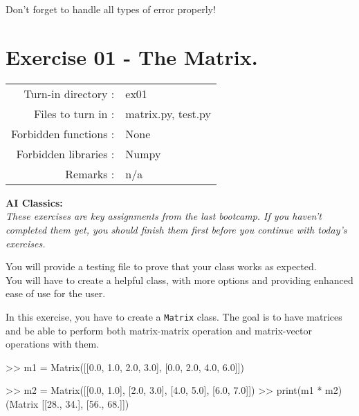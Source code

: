 \documentclass[]{article}
\newenvironment{Shaded}{\begin{snugshade}}{\end{snugshade}}
\newcommand{\BuiltInTok}[1]{\textcolor[rgb]{0.50,0.55,0.55}{#1}}
\newcommand{\FloatTok}[1]{\textcolor[rgb]{0.96,0.45,0.00}{#1}}
\newcommand{\NormalTok}[1]{\textcolor[rgb]{0.81,0.81,0.76}{#1}}
\newcommand{\OperatorTok}[1]{\textcolor[rgb]{0.81,0.81,0.76}{#1}}
\begin{document}
Don't forget to handle all types of error properly!

\clearpage

\hypertarget{exercise-01---the-matrix.}{%
\section{Exercise 01 - The Matrix.}\label{exercise-01---the-matrix.}}

\begin{longtable}[]{@{}rl@{}}
\toprule
\endhead
Turn-in directory : & ex01\tabularnewline
Files to turn in : & matrix.py, test.py\tabularnewline
Forbidden functions : & None\tabularnewline
Forbidden libraries : & Numpy\tabularnewline
Remarks : & n/a\tabularnewline
\bottomrule
\end{longtable}

\textbf{AI Classics:}\\
\emph{These exercises are key assignments from the last bootcamp. If you
haven't completed them yet, you should finish them first before you
continue with today's exercises.}

You will provide a testing file to prove that your class works as
expected.\\
You will have to create a helpful class, with more options and providing
enhanced ease of use for the user.

In this exercise, you have to create a \texttt{Matrix} class. The goal
is to have matrices and be able to perform both matrix-matrix operation
and matrix-vector operations with them.

\begin{Shaded}
\begin{Highlighting}[]
\OperatorTok{>>}\NormalTok{ m1 }\OperatorTok{=}\NormalTok{ Matrix([[}\FloatTok{0.0}\NormalTok{, }\FloatTok{1.0}\NormalTok{, }\FloatTok{2.0}\NormalTok{, }\FloatTok{3.0}\NormalTok{], }
\NormalTok{                [}\FloatTok{0.0}\NormalTok{, }\FloatTok{2.0}\NormalTok{, }\FloatTok{4.0}\NormalTok{, }\FloatTok{6.0}\NormalTok{]])}

\OperatorTok{>>}\NormalTok{ m2 }\OperatorTok{=}\NormalTok{ Matrix([[}\FloatTok{0.0}\NormalTok{, }\FloatTok{1.0}\NormalTok{],}
\NormalTok{                [}\FloatTok{2.0}\NormalTok{, }\FloatTok{3.0}\NormalTok{],}
\NormalTok{                [}\FloatTok{4.0}\NormalTok{, }\FloatTok{5.0}\NormalTok{],}
\NormalTok{                [}\FloatTok{6.0}\NormalTok{, }\FloatTok{7.0}\NormalTok{]])}
\OperatorTok{>>} \BuiltInTok{print}\NormalTok{(m1 }\OperatorTok{*}\NormalTok{ m2)}
\NormalTok{(Matrix [[}\FloatTok{28.}\NormalTok{, }\FloatTok{34.}\NormalTok{], [}\FloatTok{56.}\NormalTok{, }\FloatTok{68.}\NormalTok{]])}
\end{Highlighting}
\end{Shaded}
\end{document}
